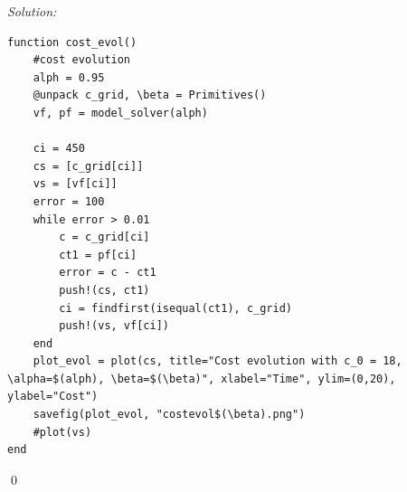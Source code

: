 \documentclass[12pt]{article}
\newenvironment{sol}
           {\emph{Solution:}
           }
           {
           \qed
           }
\begin{document}
\begin{sol}
\begin{lstlisting}
function cost_evol()
    #cost evolution
    alph = 0.95
    @unpack c_grid, \beta = Primitives()
    vf, pf = model_solver(alph)
    
    ci = 450
    cs = [c_grid[ci]]
    vs = [vf[ci]]
    error = 100
    while error > 0.01
        c = c_grid[ci]
        ct1 = pf[ci]
        error = c - ct1
        push!(cs, ct1)
        ci = findfirst(isequal(ct1), c_grid)
        push!(vs, vf[ci])
    end
    plot_evol = plot(cs, title="Cost evolution with c_0 = 18, \alpha=$(alph), \beta=$(\beta)", xlabel="Time", ylim=(0,20), ylabel="Cost")
    savefig(plot_evol, "costevol$(\beta).png")
    #plot(vs)
end
        \end{lstlisting}
       \end{sol}
       
\end{document}
